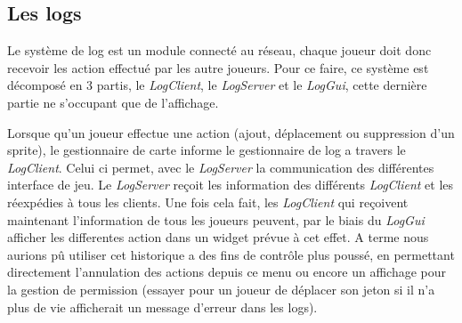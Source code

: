 \subsection{Les logs}

Le système de log est un module  connecté au réseau, chaque joueur doit donc recevoir les action effectué par les autre joueurs.
Pour ce faire, ce système est décomposé en 3 partis,
le \textit{LogClient}, le \textit{LogServer} et le \textit{LogGui},
cette dernière partie ne s'occupant que de l'affichage.

Lorsque qu'un joueur effectue une action (ajout, déplacement ou suppression d'un sprite), le gestionnaire de carte informe le gestionnaire de log a travers le \textit{LogClient}.
Celui ci permet, avec le \textit{LogServer} la communication des différentes interface de jeu.
Le \textit{LogServer} reçoit les information des différents \textit{LogClient} et les réexpédies à tous les clients.
Une fois cela fait, les \textit{LogClient} qui reçoivent maintenant l'information de tous les joueurs peuvent, par le biais du \textit{LogGui} afficher les differentes action dans un widget prévue à cet effet.
A terme nous aurions pû utiliser cet historique a des fins de contrôle plus poussé, en permettant directement l'annulation des actions depuis ce menu ou encore un affichage pour la gestion de permission (essayer pour un joueur de déplacer son jeton si il n'a plus de vie afficherait un message d'erreur dans les logs).